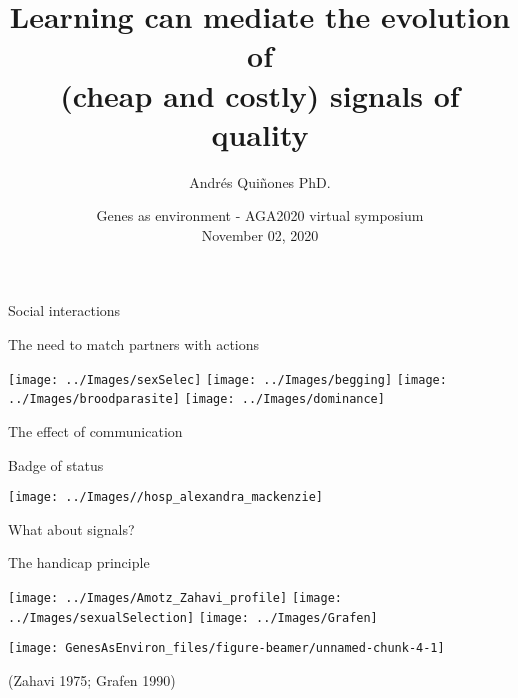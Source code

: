 \documentclass[
  ignorenonframetext,
]{beamer}
\title{Learning can mediate the evolution of\\
(cheap and costly) signals of quality}
\author{Andrés Quiñones PhD.}
\date{Genes as environment - AGA2020 virtual symposium\\
November 02, 2020}
\begin{document}
\frame{\titlepage}

\begin{frame}{Social interactions}
\protect\hypertarget{social-interactions}{}

\begin{block}{The need to match partners with actions}

\begin{center}\texttt{[image: ../Images/sexSelec]} \texttt{[image: ../Images/begging]} \texttt{[image: ../Images/broodparasite]} \texttt{[image: ../Images/dominance]} \end{center}

\end{block}

\end{frame}

\begin{frame}{The effect of communication}
\protect\hypertarget{the-effect-of-communication}{}

\begin{block}{Badge of status}

\begin{center}\texttt{[image: ../Images//hosp\_alexandra\_mackenzie]} \end{center}

\end{block}

\end{frame}

\begin{frame}{What about signals?}
\protect\hypertarget{what-about-signals}{}

\begin{block}{The handicap principle}

\begin{center}\texttt{[image: ../Images/Amotz\_Zahavi\_profile]} \texttt{[image: ../Images/sexualSelection]} \texttt{[image: ../Images/Grafen]} \end{center}

\begin{center}\texttt{[image: GenesAsEnviron\_files/figure-beamer/unnamed-chunk-4-1]} \end{center}

(Zahavi 1975; Grafen 1990)

\end{block}

\end{frame}
\end{document}
